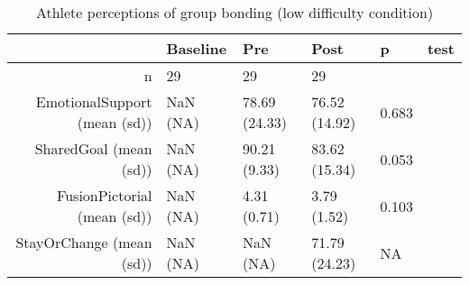 \begin{table}[ht]
\centering
\begin{tabular}{rlllll}
  \hline
 & Baseline & Pre & Post & p & test \\ 
  \hline
n &  29 &    29 &    29 &  &  \\ 
  EmotionalSupport (mean (sd)) & NaN (NA) & 78.69 (24.33) & 76.52 (14.92) &  0.683 &  \\ 
  SharedGoal (mean (sd)) & NaN (NA) & 90.21 (9.33) & 83.62 (15.34) &  0.053 &  \\ 
  FusionPictorial (mean (sd)) & NaN (NA) &  4.31 (0.71) &  3.79 (1.52) &  0.103 &  \\ 
  StayOrChange (mean (sd)) & NaN (NA) &   NaN (NA) & 71.79 (24.23) &  NA &  \\ 
   \hline
\end{tabular}
\caption{Athlete perceptions of 
 group bonding (low difficulty condition)} 
\end{table}
